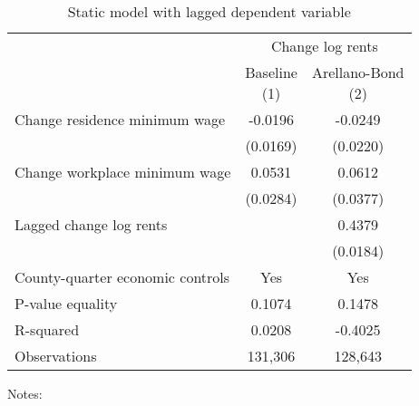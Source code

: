 \begin{table}
    \caption{Static model with lagged dependent variable}
    \label{tab:static_ab}

    \begin{tabular}{@{}lcc@{}}
        \toprule
                               & \multicolumn{2}{c}{Change log rents}                       \\ \cmidrule(l){2-3}
                               & \shortsack{Baseline\\(1)} & \shortsack{Arellano-Bond\\(2)} \\ \midrule
        Change residence minimum wage     &  -0.0196           &  -0.0249                           \\
                                          & (0.0169)          & (0.0220)                          \\
        Change workplace minimum wage     &  0.0531           & 0.0612                            \\
                                          & (0.0284)          & (0.0377)                          \\
        Lagged change log rents           &                & 0.4379                            \\
                                          &                & (0.0184)                          \\ \midrule
        County-quarter economic controls  & Yes            & Yes                            \\
        P-value equality                  & 0.1074            & 0.1478                            \\
        R-squared                         & 0.0208            & -0.4025                            \\
        Observations                      & 131,306           & 128,643                           \\ \bottomrule
    \end{tabular}

    \begin{minipage}{.95\textwidth} \footnotesize
        \vspace{2mm}
        Notes: 
    \end{minipage}
\end{table}
